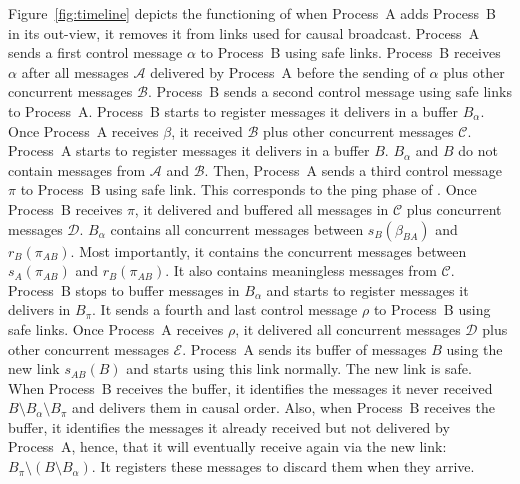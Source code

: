 Figure~\ref{fig:timeline} depicts the functioning of \RPCBROADCAST when
Process~A adds Process~B in its out-view, it removes it from links used for
causal broadcast. Process~A sends a first control message $\alpha$ to Process~B
using safe links. Process~B receives $\alpha$ after all messages $\mathcal{A}$
delivered by Process~A before the sending of $\alpha$ plus other concurrent
messages $\mathcal{B}$. Process~B sends a second control message using safe
links to Process~A. Process~B starts to register messages it delivers in a
buffer $B_\alpha$.  Once Process~A receives $\beta$, it received $\mathcal{B}$
plus other concurrent messages $\mathcal{C}$. Process~A starts to register
messages it delivers in a buffer $B$. $B_\alpha$ and $B$ do not contain messages
from $\mathcal{A}$ and $\mathcal{B}$. Then, Process~A sends a third control
message $\pi$ to Process~B using safe link. This corresponds to the ping phase
of \PCBROADCAST.  Once Process~B receives $\pi$, it delivered and buffered all
messages in $\mathcal{C}$ plus concurrent messages $\mathcal{D}$. $B_\alpha$
contains all concurrent messages between $s_B(\beta_{BA})$ and
$r_B(\pi_{AB})$. Most importantly, it contains the concurrent messages between
$s_A(\pi_{AB})$ and $r_B(\pi_{AB})$. It also contains meaningless messages from
$\mathcal{C}$.  Process~B stops to buffer messages in $B_\alpha$ and starts to
register messages it delivers in $B_\pi$. It sends a fourth and last control
message $\rho$ to Process~B using safe links. Once Process~A receives $\rho$, it
delivered all concurrent messages $\mathcal{D}$ plus other concurrent messages
$\mathcal{E}$. Process~A sends its buffer of messages $B$ using the new link
$s_{AB}(B)$ and starts using this link normally. The new link is safe. When
Process~B receives the buffer, it identifies the messages it never received
$B\setminus B_\alpha \setminus B_\pi$ and delivers them in causal order. Also,
when Process~B receives the buffer, it identifies the messages it already
received but not delivered by Process~A, hence, that it will eventually receive
again via the new link: $B_\pi \setminus (B \setminus B_\alpha)$.  It registers
these messages to discard them when they arrive.

\begin{figure*}
  \begin{center}
    
    \caption{\label{fig:timeline}Timeline.}
  \end{center}
\end{figure*}

